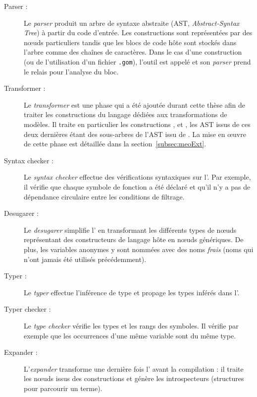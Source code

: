 \begin{description}

  \item[Parser :] Le \emph{parser} produit un arbre de syntaxe abstraite (AST,
    \emph{Abstract-Syntax Tree}) à partir du code d'entrée. Les constructions
    {\tom} sont représentées par des nœuds particuliers tandis que les blocs de
    code hôte sont stockés dans l'arbre comme des chaînes de caractères. Dans
    le cas d'une construction  (ou de l'utilisation d'un fichier
    \texttt{.gom}), l'outil {\gom} est appelé et son \emph{parser} prend le
    relais pour l'analyse du bloc.

  \item[Transformer :] Le \emph{transformer} est une phase qui a été ajoutée
    durant cette thèse afin de traiter les constructions du langage dédiées aux
    transformations de modèles. Il traite en particulier les constructions
    ,  et , les AST issus
    de ces deux dernières étant des sous-arbres de l'AST issu de
    . La mise en œuvre de cette phase est détaillée dans
    la section~\ref{subsec:meoExt}.

  \item[Syntax checker :] Le \emph{syntax checker} effectue des vérifications
    syntaxiques sur l'{\AST}. Par exemple, il vérifie que chaque symbole de
    fonction a été déclaré et qu'il n'y a pas de dépendance circulaire entre
    les conditions de filtrage.

  \item[Desugarer :] Le \emph{desugarer} simplifie l'{\AST} en transformant les
    différents types de nœuds représentant des constructeurs de langage hôte en
    nœuds génériques. De plus, les variables anonymes y sont nommées avec des
    noms \emph{frais} (noms qui n'ont jamais été utilisés précédemment).

  \item[Typer :] Le \emph{typer} effectue l'inférence de type et propage les
    types inférés dans l'{\AST}.

  \item[Typer checker :] Le \emph{type checker} vérifie les types et les rangs
    des symboles. Il vérifie par exemple que les occurrences d'une même
    variable sont du même type.

  \item[Expander :] L'\emph{expander} transforme une dernière fois l'{\AST}
    avant la compilation : il traite les nœuds issus des constructions
     et génère les introspecteurs (structures pour parcourir un
    terme).


\end{description}

